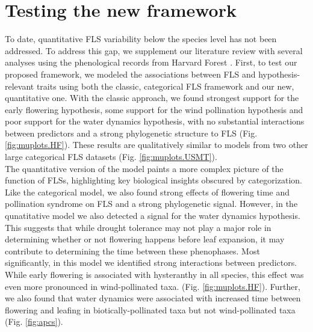 \documentclass{article}
\begin{document}
\section*{Testing the new framework}

To date, quantitative FLS variability below the species level has not been addressed. To address this gap, we supplement our literature review with several analyses using the phenological records from Harvard Forest \citep{OKeefe2015}. First, to test our proposed framework, we modeled the associations between FLS and hypothesis-relevant traits using both the classic, categorical FLS framework and our new, quantitative one. With the classic approach, we found strongest support for the early flowering hypothesis, some support for the wind pollination hypothesis and poor support for the water dynamics hypothesis, with no substantial interactions between predictors and a strong phylogenetic structure to FLS (Fig. \ref{fig:muplots.HF}). These results are qualitatively similar to models from two other large categorical FLS datasets (Fig. \ref{fig:muplots.USMT}). \\

\noindent The quantitative version of the model paints a more complex picture of the function of FLSs, highlighting key biological insights obscured by categorization. Like the categorical model, we also found strong effects of flowering time and pollination syndrome on FLS and a strong phylogenetic signal. However, in the qunatitative model we also detected a signal for the water dynamics hypothesis. This suggests that while drought tolerance may not play a major role in determining whether or not flowering happens before leaf expansion, it may contribute to determining the time between these phenophases. Most significantly, in this model we identified strong interactions between predictors. While early flowering is associated with hysteranthy in all species, this effect was even more pronounced in wind-pollinated taxa. (Fig. \ref{fig:muplots.HF}). Further, we also found that water dynamics were associated with increased time between flowering and leafing in biotically-pollinated taxa but not wind-pollinated taxa (Fig. \ref{fig:apcs}). \\ 
\end{document}
